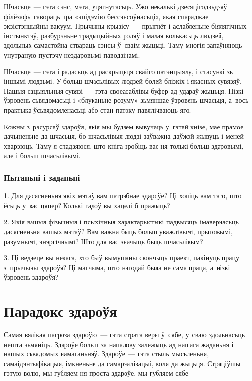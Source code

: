 Шчасьце~--- гэта сэнс, мэта, уцягнутасьць. Ужо некалькі дзесяцігодзьдзяў філёзафы гавораць пра «эпідэмію бессэнсоўнасьці», якая спараджае экзістэнцыйны вакуум. Прычыны крызісу~--- прыгнёт і аслабленьне біялягічных інстынктаў, разбурэньне традыцыйных роляў і малая колькасьць людзей, здольных самастойна ствараць сэнсы ў~сваім жыцьці. Таму многія запаўняюць унутраную пустэчу нездаровымі паводзінамі.

Шчасьце~--- гэта і радасьць ад раскрыцьця свайго патэнцыялу, і стасункі зь іншымі людзьмі. У больш шчасьлівых людзей болей блізкіх і якасных сувязяў. Нашыя сацыяльныя сувязі~--- гэта своеасаблівы буфер ад удараў жыцьця. Нізкі ўзровень сьвядомасьці і «блуканьне розуму» зьмяншае ўзровень шчасьця, а~вось практыка ўсьвядомленасьці або стан патоку павялічваюць яго.

Кожны з~рэсурсаў здароўя, якія мы будзем вывучаць у~гэтай кнізе, мае прамое дачыненьне да шчасьця, бо шчасьлівыя людзі заўважна даўжэй жывуць і меней хварэюць. Таму я спадзяюся, што кніга зробіць вас ня толькі больш здаровымі, але і больш шчасьлівымі.


\subsubsection{Пытаньні і заданьні}

1. Для дасягненьня якіх мэтаў вам патрэбнае здароўе? Ці хопіць вам таго, што ёсьць у~вас цяпер? Колькі гадоў вы хацелі б пражыць?

2. Якія вашыя фізычныя і псыхічныя характарыстыкі падвысяць імавернасьць дасягненьня вашых мэтаў? Вам важна быць больш уважлiвымi, прыгожымі, разумнымi, энэргiчнымi? Што для вас значыць быць шчасьлівым?

3. Ці ведаеце вы некага, хто быў вымушаны скончыць праект, пакінуць працу з~прычыны здароўя? Ці магчыма, што нагодай была не сама праца, а~нізкі ўзровень здароўя?


\section{Парадокс здароўя}

Самая вялікая пагроза здароўю~--- гэта страта веры ў~сябе, у~сваю здольнасьць нешта зьмяніць. Здароўе больш за напалову залежыць ад нашага жаданьня і нашых сьвядомых намаганьняў. Здароўе~--- гэта стыль мысьленьня, самаідэнтыфікацыя, імкненьне да самарэалізацыі, воля да жыцьця. Страціўшы гэтую волю, мы губляем ня проста здароўе, мы губляем сябе. 

